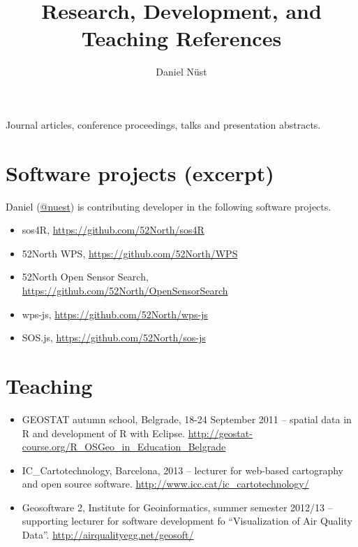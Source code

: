 \documentclass{article}
\title{Research, Development, and Teaching References\vspace{-2ex} %
}
\author{Daniel N\"ust}
\begin{document}
\maketitle

Journal articles, conference proceedings, talks and presentation abstracts.

\nocite{*}

%

%

\printbibliography


\section*{Software projects (excerpt)}

Daniel (\href{https://github.com/nuest/}{@nuest}) is contributing developer in the following software projects.

\begin{itemize}
	\item sos4R, \url{https://github.com/52North/sos4R}
	\item 52\degree North WPS, \url{https://github.com/52North/WPS}
	\item 52\degree North Open Sensor Search, \url{https://github.com/52North/OpenSensorSearch}
	\item wps-js, \url{https://github.com/52North/wps-js}
	\item SOS.js, \url{https://github.com/52North/sos-js}
\end{itemize}


\section*{Teaching}

\begin{itemize}
	\item GEOSTAT autumn school, Belgrade, 18-24 September 2011 -- spatial data in R and development of R with Eclipse. \url{ http://geostat-course.org/R_OSGeo_in_Education_Belgrade}
	\item IC\_Cartotechnology, Barcelona, 2013 -- lecturer for web-based cartography and open source software. \url{http://www.icc.cat/ic_cartotechnology/}
	\item Geosoftware 2, Institute for Geoinformatics, summer semester 2012/13 -- supporting lecturer for software development fo \enquote{Visualization of Air Quality Data}. \url{http://airqualityegg.net/geosoft/}
\end{itemize}
\end{document}
